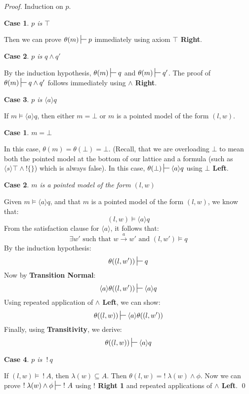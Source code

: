 \documentclass[smallextended]{svjour3}       %
\newtheorem{mycase}{Case}
\newtheorem{subcase}{Case}
\numberwithin{subcase}{mycase}
\def\fBang {\ ! \ }
\def\judge {\sststile{\mathrm{}}{}}
\begin{document}
\begin{proof}
Induction on $p$.
\setcounter{mycase}{0}

\begin{mycase}
$p$ is $\top$
\end{mycase}
Then we can prove  $\theta(m) \judge p$ immediately using axiom {\bf $\top$ Right}.

\begin{mycase}
$p$ is $q \land q'$
\end{mycase}
By the induction hypothesis, $\theta(m) \judge q$ and $\theta(m) \judge q'$.
The proof of $\theta(m) \judge q \land q'$ follows immediately using {\bf $\land$ Right}.

\begin{mycase}
$p$ is $\langle a \rangle q$
\end{mycase}
If $m \models \langle a \rangle q$, then either $m = \bot$ or $m$ is a pointed model of the form $(l,w)$.
\begin{subcase}
$m = \bot$
\end{subcase}
In this case, $\theta(m) = \theta(\bot) = \bot$. (Recall, that we are overloading $\bot$ to mean both the pointed model at the bottom of our lattice and a formula (such as $\langle s \rangle \top \land !\{\}$) which is always false).
In this case, $ \theta(\bot) \judge  \langle a \rangle q$ using {\bf $\bot$ Left}.

\begin{subcase}
 $m$ is a pointed model of the form $(l,w)$
 \end{subcase}
Given $m \models \langle a \rangle q$, and that $m$ is a pointed model of the form $(l,w)$, we know that:
\[
(l,w) \models \langle a \rangle q
\]
From the satisfaction clause for $\langle a \rangle$, it follows that:
\[
\exists w' \mbox{ such that } w \xrightarrow{a} w' \mbox { and } (l,w') \models q
\]
By the induction hypothesis:
\[
\theta( (l,w') ) \judge q
\]
Now by {\bf Transition Normal}:
\[
\langle a \rangle \theta( (l,w') ) \judge \langle a \rangle q
\]
Using repeated application of {\bf $\land$ Left}, we can show:
\[
\theta((l,w)) \judge \langle a \rangle \theta((l,w'))
\]
Finally, using {\bf Transitivity}, we derive:
\[
\theta((l,w)) \judge  \langle a \rangle q
\]
\begin{mycase}
$p$ is $\fBang q$
\end{mycase}
If $(l,w) \models \fBang A$, then $\lambda(w) \subseteq A$.
Then $\theta(l,w) = ! \; \lambda(w) \land \phi$.
Now we can prove $! \; \lambda(w) \land \phi \judge \fBang A$ using  {\bf $!$ Right 1} and repeated applications of {\bf $\land$ Left}.
\qed
\end{proof}
\end{document}
